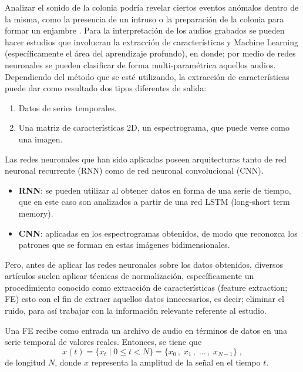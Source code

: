 \documentclass[12pt]{report}
\begin{document}
	\par Analizar el sonido de la colonia podría revelar ciertos eventos anómalos dentro de la misma, como la presencia de un intruso o la preparación de la colonia para formar un enjambre \cite{varkonyi2023dynamic}. Para la interpretación de los audios grabados se pueden hacer estudios que involucran la extracción de características y Machine Learning (específicamente el área del aprendizaje profundo), en donde; por medio de redes neuronales se pueden clasificar de forma multi-paramétrica aquellos audios. Dependiendo del método que se esté utilizando, la extracción de características puede dar como resultado dos tipos diferentes de salida: 
	
	\begin{enumerate}
		\item Datos de series temporales.
		\item Una matriz de características 2D, un espectrograma, que puede verse como una imagen.
	\end{enumerate}
	
	 Las redes neuronales que han sido aplicadas poseen arquitecturas tanto de red neuronal recurrente (RNN) como de red neuronal convolucional (CNN).
	
	\begin{itemize}
		\item \textbf{RNN}: se pueden utilizar al obtener datos en forma de una serie de tiempo, que en este caso son analizados a partir de una red LSTM (long-short term memory).
		\item \textbf{CNN}: aplicadas en los espectrogramas obtenidos, de modo que reconozca los patrones que se forman en estas imágenes bidimensionales.
	\end{itemize}
	
	Pero, antes de aplicar las redes neuronales sobre los datos obtenidos, diversos artículos suelen aplicar técnicas de normalización, específicamente un procedimiento conocido como extracción de características (feature extraction; FE) \cite{cecchi2020smart, terenzi2020importance, varkonyi2023dynamic, zlatkova2020honeybees, hunter2019processing} esto con el fin de extraer aquellos datos innecesarios, es decir; eliminar el ruido, para así trabajar con la información relevante referente al estudio. 
	
	\par Una FE recibe como entrada un archivo de audio en términos de datos en una serie temporal de valores reales. Entonces, se tiene que
	\begin{equation*}
		x(t) = \{ x_t \; | \; 0 \le t < N \} = \{ x_0 \, , \; x_1 \, , \; ... \, , \; x_{N - 1} \} \; ,
	\end{equation*}
	de longitud $N$, donde $x$ representa la amplitud de la señal en el tiempo $t$.
	
\end{document}
